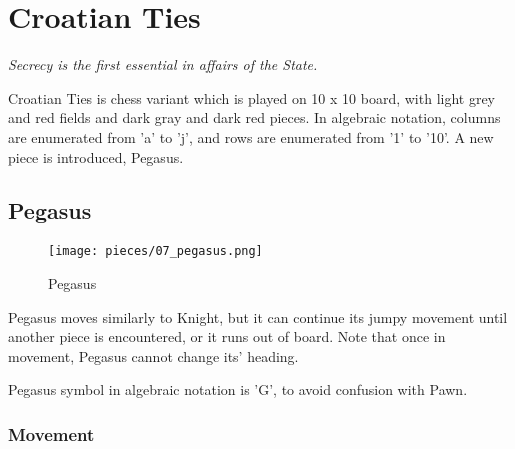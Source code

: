 

\chapter*{Croatian Ties}

\begin{flushright}
\parbox{0.7\textwidth}{
\emph{Secrecy is the first essential in affairs of the State. \\
 } }
\end{flushright}

\noindent
Croatian Ties is chess variant which is played on 10 x 10 board,
with light grey and red fields and dark gray and dark red pieces.
In algebraic notation, columns are enumerated from 'a' to 'j',
and rows are enumerated from '1' to '10'. A new piece is
introduced, Pegasus.

\clearpage %

\section*{Pegasus}

\noindent
\begin{wrapfigure}[9]{l}{0.4\textwidth}
\centering
\texttt{[image: pieces/07\_pegasus.png]}
\caption{Pegasus}
\label{fig:07_pegasus}
\end{wrapfigure}
Pegasus moves similarly to Knight, but it can continue its jumpy movement
until another piece is encountered, or it runs out of board. Note that once
in movement, Pegasus cannot change its' heading.

Pegasus symbol in algebraic notation is 'G', to avoid confusion with Pawn.

\vspace{2.0\baselineskip}
\subsection*{Movement}

